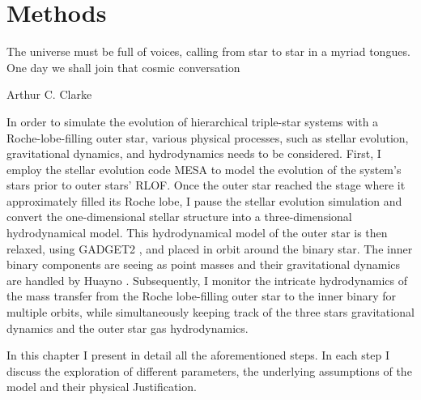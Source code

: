 \chapter{Methods}\label{methods}

\epigraph{The universe must be full of voices, calling from star to star in a myriad tongues. One day we shall join that cosmic conversation}{Arthur C. Clarke}

In order to simulate the evolution of hierarchical triple-star systems with a  Roche-lobe-filling outer star, various physical processes, such as stellar evolution, gravitational dynamics, and hydrodynamics needs to be considered. First, I employ the stellar evolution code MESA \citep{paxton2010modules,paxton2013modules,paxton2015modules,paxton2019modules} to model the evolution of the system's stars prior to outer stars' RLOF. Once the outer star reached the stage where it approximately filled its Roche lobe, I pause the stellar evolution simulation and convert the one-dimensional stellar structure into a three-dimensional hydrodynamical model. This hydrodynamical model of the outer star is then relaxed, using GADGET2 \citep{springel2005cosmological}, and placed in orbit around the binary star. The inner binary components are seeing as point masses and their gravitational dynamics are handled by Huayno \citep{pelupessy2012n}. Subsequently, I monitor the intricate hydrodynamics of the mass transfer from the Roche lobe-filling outer star to the inner binary for multiple orbits, while simultaneously keeping track of the three stars gravitational dynamics and the outer star gas hydrodynamics. 

In this chapter I present in detail all the aforementioned steps. In each step I discuss the exploration of different parameters, the underlying assumptions of the model and their physical Justification.






